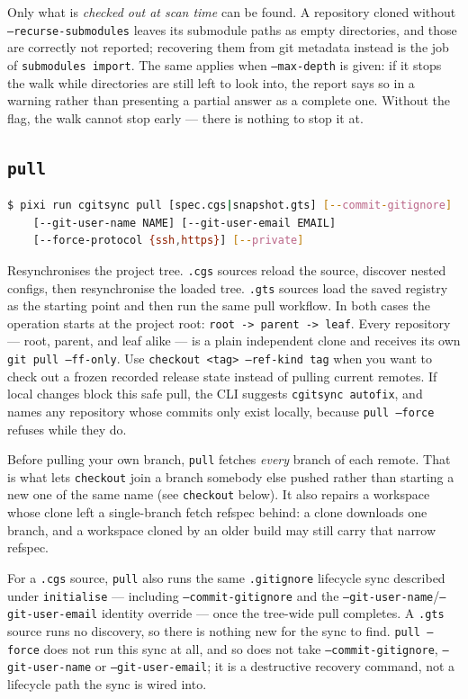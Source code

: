 Only what is \emph{checked out at scan time} can be found. A repository
cloned without \texttt{--recurse-submodules} leaves its submodule paths as
empty directories, and those are correctly not reported; recovering them
from git metadata instead is the job of \texttt{submodules import}. The same
applies when \texttt{--max-depth} is given: if it stops the walk while
directories are still left to look into, the report says so in a warning
rather than presenting a partial answer as a complete one. Without the
flag, the walk cannot stop early --- there is nothing to stop it at.

\subsection{\texttt{pull}}

\begin{lstlisting}[language=bash]
$ pixi run cgitsync pull [spec.cgs|snapshot.gts] [--commit-gitignore]
    [--git-user-name NAME] [--git-user-email EMAIL]
    [--force-protocol {ssh,https}] [--private]
\end{lstlisting}

Resynchronises the project tree.  \texttt{.cgs} sources reload the source,
discover nested configs, then resynchronise the loaded tree.  \texttt{.gts}
sources load the saved registry as the starting point and then run the same
pull workflow.  In both cases the operation starts at the project root:
\texttt{root -> parent -> leaf}.  Every repository --- root, parent, and leaf
alike --- is a plain independent clone and receives its own
\texttt{git pull --ff-only}.  Use \texttt{checkout <tag> --ref-kind tag} when you want to
check out a frozen recorded release state instead of pulling current
remotes.  If local changes block this safe pull, the CLI
suggests \texttt{cgitsync autofix}, and names any repository whose commits only
exist locally, because \texttt{pull --force} refuses while they do.

Before pulling your own branch, \texttt{pull} fetches \emph{every} branch
of each remote. That is what lets \texttt{checkout} join a branch somebody
else pushed rather than starting a new one of the same name (see
\texttt{checkout} below). It also repairs a workspace whose clone left a
single-branch fetch refspec behind: a clone downloads one branch, and a
workspace cloned by an older build may still carry that narrow refspec.

For a \texttt{.cgs} source, \texttt{pull} also runs the same
\texttt{.gitignore} lifecycle sync described under \texttt{initialise} ---
including \texttt{--commit-gitignore} and
the \texttt{--git-user-name}/\texttt{--git-user-email} identity override ---
once the tree-wide pull completes. A \texttt{.gts} source runs no discovery,
so there is nothing new for the sync to find. \texttt{pull --force} does not
run this sync at all, and so does not take \texttt{--commit-gitignore},
\texttt{--git-user-name} or \texttt{--git-user-email}; it is a destructive
recovery command, not a lifecycle path the sync is wired into.

